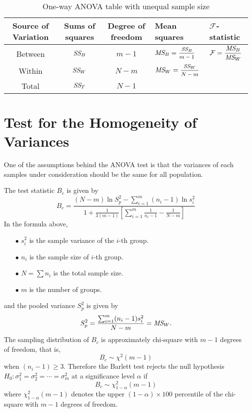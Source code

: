\begin{table}[h!]
\renewcommand{\arraystretch}{1.2}
\begin{tabularx}{\textwidth}{cc c p{2.5cm} p{2.5cm}}
    \toprule
    Source of Variation & Sums of squares & Degree of freedom & Mean squares & $\mathcal{F}$-statistic \\[0.6em]
    \midrule
    Between & $\textit{SS}_{B}$ & $m - 1$ & $\MS{B} = \mfrac{\CS{B}}{m-1}$ & $\displaystyle \mathcal{F} = \frac{\textit{MS}_{B} }{\textit{MS}_{W} }$ \\[0.6em]
    Within & $\textit{SS}_{W}$ & $N - m$ & $\MS{W} = \mfrac{\CS{W}}{N-m}$ & \\
    \hline
    Total & $\textit{SS}_{T}$ & $N - 1$ & & \\
    \bottomrule
\end{tabularx}
\caption{One-way ANOVA table with unequal sample size}
\end{table}

\section{Test for the Homogeneity of Variances}

One of the assumptions behind the ANOVA test is that the variances 
of each samples under consideration should be the same for all population.

The test statistic $B_c$ is given by
\begin{equation}
    B_c = \frac{(N -m) \ln S^2_p - \sum^m_{i=1} (n_i - 1) \ln s^2_i }{\displaystyle 1 + \frac{1}{3(m-1)} 
    \left[ \sum^m_{i=1} \frac{1}{n_i - 1} - \frac{1}{N - m} \right]}
\end{equation}
In the formula above, 
\begin{itemize}
    \item[$\bullet$] $s^2_i$ is the sample variance of the $i$-th group.
    \item[$\bullet$] $n_i$ is the sample size of $i$-th group.
    \item[$\bullet$] $N = \sum n_i$ is the total sample size.
    \item[$\bullet$] $m$ is the number of groups. 
\end{itemize}

and the pooled variance $S^2_p$ is given by
\begin{equation}
    S^2_p = \frac{\sum^m_{i=1} (n_i - 1) s^2_i}{N - m} = \textit{MS}_{W}.
\end{equation}
The sampling distribution of $B_c$ is approximately chi-square with $m - 1$ degrees of freedom, that is,
\[
    B_c \sim \chi^2 (m-1)
\]
when $(n_i - 1) \geq 3$. Therefore the Barlett test rejects the null hypothesis 
$H_0 : \sigma^2_1 = \sigma^2_2 = \cdots = \sigma^2_m$ at a significance level $\alpha$ if 
\[
    B_c \sim \chi^2_{1 - \alpha} (m-1)
\]
where $\chi^2_{1 - \alpha} (m-1)$ denotes the upper $(1 - \alpha) \times 100$ percentile of the chi-square 
with $m-1$ degrees of freedom.

